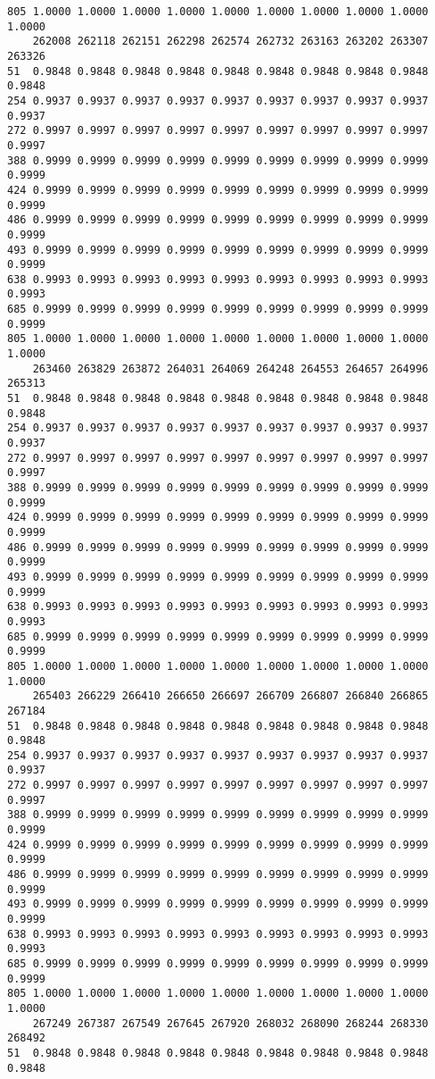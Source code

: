 \documentclass[
]{report}
\begin{document}
\begin{verbatim}
805 1.0000 1.0000 1.0000 1.0000 1.0000 1.0000 1.0000 1.0000 1.0000 1.0000
    262008 262118 262151 262298 262574 262732 263163 263202 263307 263326
51  0.9848 0.9848 0.9848 0.9848 0.9848 0.9848 0.9848 0.9848 0.9848 0.9848
254 0.9937 0.9937 0.9937 0.9937 0.9937 0.9937 0.9937 0.9937 0.9937 0.9937
272 0.9997 0.9997 0.9997 0.9997 0.9997 0.9997 0.9997 0.9997 0.9997 0.9997
388 0.9999 0.9999 0.9999 0.9999 0.9999 0.9999 0.9999 0.9999 0.9999 0.9999
424 0.9999 0.9999 0.9999 0.9999 0.9999 0.9999 0.9999 0.9999 0.9999 0.9999
486 0.9999 0.9999 0.9999 0.9999 0.9999 0.9999 0.9999 0.9999 0.9999 0.9999
493 0.9999 0.9999 0.9999 0.9999 0.9999 0.9999 0.9999 0.9999 0.9999 0.9999
638 0.9993 0.9993 0.9993 0.9993 0.9993 0.9993 0.9993 0.9993 0.9993 0.9993
685 0.9999 0.9999 0.9999 0.9999 0.9999 0.9999 0.9999 0.9999 0.9999 0.9999
805 1.0000 1.0000 1.0000 1.0000 1.0000 1.0000 1.0000 1.0000 1.0000 1.0000
    263460 263829 263872 264031 264069 264248 264553 264657 264996 265313
51  0.9848 0.9848 0.9848 0.9848 0.9848 0.9848 0.9848 0.9848 0.9848 0.9848
254 0.9937 0.9937 0.9937 0.9937 0.9937 0.9937 0.9937 0.9937 0.9937 0.9937
272 0.9997 0.9997 0.9997 0.9997 0.9997 0.9997 0.9997 0.9997 0.9997 0.9997
388 0.9999 0.9999 0.9999 0.9999 0.9999 0.9999 0.9999 0.9999 0.9999 0.9999
424 0.9999 0.9999 0.9999 0.9999 0.9999 0.9999 0.9999 0.9999 0.9999 0.9999
486 0.9999 0.9999 0.9999 0.9999 0.9999 0.9999 0.9999 0.9999 0.9999 0.9999
493 0.9999 0.9999 0.9999 0.9999 0.9999 0.9999 0.9999 0.9999 0.9999 0.9999
638 0.9993 0.9993 0.9993 0.9993 0.9993 0.9993 0.9993 0.9993 0.9993 0.9993
685 0.9999 0.9999 0.9999 0.9999 0.9999 0.9999 0.9999 0.9999 0.9999 0.9999
805 1.0000 1.0000 1.0000 1.0000 1.0000 1.0000 1.0000 1.0000 1.0000 1.0000
    265403 266229 266410 266650 266697 266709 266807 266840 266865 267184
51  0.9848 0.9848 0.9848 0.9848 0.9848 0.9848 0.9848 0.9848 0.9848 0.9848
254 0.9937 0.9937 0.9937 0.9937 0.9937 0.9937 0.9937 0.9937 0.9937 0.9937
272 0.9997 0.9997 0.9997 0.9997 0.9997 0.9997 0.9997 0.9997 0.9997 0.9997
388 0.9999 0.9999 0.9999 0.9999 0.9999 0.9999 0.9999 0.9999 0.9999 0.9999
424 0.9999 0.9999 0.9999 0.9999 0.9999 0.9999 0.9999 0.9999 0.9999 0.9999
486 0.9999 0.9999 0.9999 0.9999 0.9999 0.9999 0.9999 0.9999 0.9999 0.9999
493 0.9999 0.9999 0.9999 0.9999 0.9999 0.9999 0.9999 0.9999 0.9999 0.9999
638 0.9993 0.9993 0.9993 0.9993 0.9993 0.9993 0.9993 0.9993 0.9993 0.9993
685 0.9999 0.9999 0.9999 0.9999 0.9999 0.9999 0.9999 0.9999 0.9999 0.9999
805 1.0000 1.0000 1.0000 1.0000 1.0000 1.0000 1.0000 1.0000 1.0000 1.0000
    267249 267387 267549 267645 267920 268032 268090 268244 268330 268492
51  0.9848 0.9848 0.9848 0.9848 0.9848 0.9848 0.9848 0.9848 0.9848 0.9848

\end{verbatim}
\end{document}
